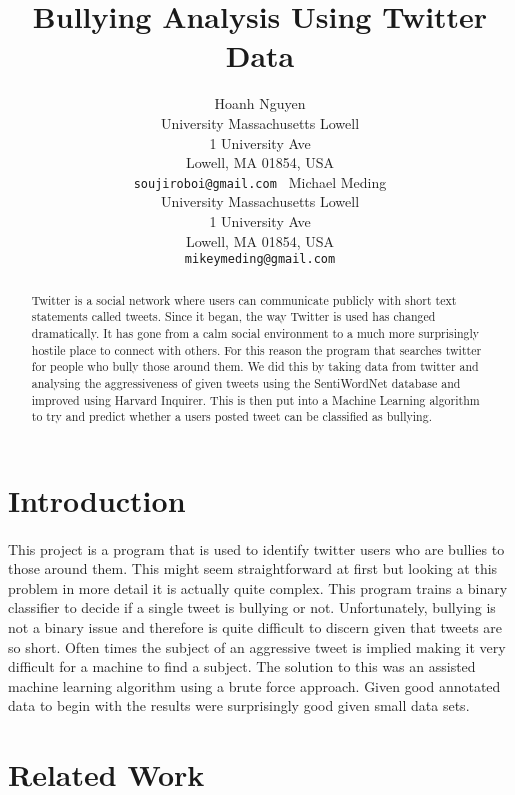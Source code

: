 \documentclass[11pt,letterpaper]{article}
\title{
Bullying Analysis Using Twitter Data
    }
\author{Hoanh Nguyen\\
	    University Massachusetts Lowell\\
	     1 University Ave\\
	     Lowell, MA 01854, USA\\
	    {\tt soujiroboi@gmail.com }
	  \And
	Michael Meding\\
  	University Massachusetts Lowell\\
	     1 University Ave\\
	     Lowell, MA 01854, USA\\
  {\tt mikeymeding@gmail.com}}
\date{}
\begin{document}
\maketitle
\begin{abstract}
  Twitter is a social network where users can communicate publicly with short text statements called tweets. Since it began, the way Twitter is used has changed dramatically. It has gone from a calm social environment to a much more surprisingly hostile place to connect with others. For this reason the program that searches twitter for people who bully those around them. We did this by taking data from twitter and analysing the aggressiveness of given tweets using the SentiWordNet database and improved using Harvard Inquirer. This is then put into a Machine Learning algorithm to try and predict whether a users posted tweet can be classified as bullying.
\end{abstract}

\section{Introduction}
\paragraph{}
This project is a program that is used to identify twitter users who are bullies to those around them. This might seem straightforward at first but looking at this problem in more detail it is actually quite complex. This program trains a binary classifier to decide if a single tweet is bullying or not. Unfortunately, bullying is not a binary issue and therefore is quite difficult to discern given that tweets are so short. Often times the subject of an aggressive tweet is implied making it very difficult for a machine to find a subject. The solution to this was an assisted machine learning algorithm using a brute force approach. Given good annotated data to begin with the results were surprisingly good given small data sets.


\section{Related Work}
\end{document}
